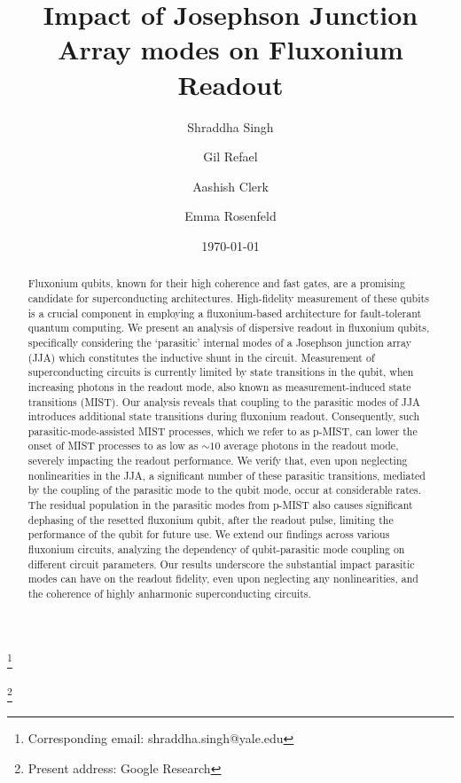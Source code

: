 \documentclass[%
reprint,
superscriptaddress,
 amsmath,amssymb,
 aps,
 prx,
longbibliography,
floatfix,
]{revtex4-2}
\begin{document}
\title{Impact of Josephson Junction Array modes on Fluxonium Readout}

\author{Shraddha Singh}\thanks{Corresponding email: shraddha.singh@yale.edu}
\author{Gil Refael}
\author{Aashish Clerk}
\author{Emma Rosenfeld}\thanks{Present address: Google Research}
\date{\today}%

\begin{abstract}
Fluxonium qubits, known for their high coherence and fast gates, are a promising candidate for superconducting architectures. High-fidelity measurement of these qubits is a crucial component in employing a fluxonium-based architecture for fault-tolerant quantum computing. We present an analysis of dispersive readout in fluxonium qubits, specifically considering the `parasitic' internal modes of a Josephson junction array (JJA) which constitutes the inductive shunt in the circuit. %
Measurement of superconducting circuits is currently limited by state transitions in the qubit, when increasing photons in the readout mode, also known as measurement-induced state transitions (MIST). 
Our analysis reveals that coupling to the parasitic modes of JJA introduces additional state transitions during fluxonium readout. Consequently, such parasitic-mode-assisted MIST processes, which we refer to as p-MIST, can lower the onset of MIST processes to as low as $\sim 10$ average photons in the readout mode, severely impacting the readout performance. We verify that, even upon neglecting nonlinearities in the JJA, a significant number of these parasitic transitions, mediated by the coupling of the parasitic mode to the qubit mode, occur at considerable rates. The residual population in the parasitic modes from p-MIST also causes significant dephasing of the resetted fluxonium qubit, after the readout pulse, limiting the performance of the qubit for future use. We extend our findings across various fluxonium circuits, analyzing the dependency of qubit-parasitic mode coupling on different circuit parameters. Our results underscore the substantial impact parasitic modes can have on the readout fidelity, even upon neglecting any nonlinearities, and the coherence of highly anharmonic superconducting circuits.
\end{abstract}
\maketitle
\end{document}
